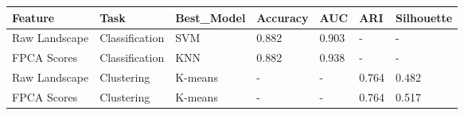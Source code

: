 
\begin{tabular}{lllllll}
\toprule
Feature & Task & Best\_Model & Accuracy & AUC & ARI & Silhouette\\
\midrule
Raw Landscape & Classification & SVM & 0.882 & 0.903 & - & -\\
FPCA Scores & Classification & KNN & 0.882 & 0.938 & - & -\\
Raw Landscape & Clustering & K-means & - & - & 0.764 & 0.482\\
FPCA Scores & Clustering & K-means & - & - & 0.764 & 0.517\\
\bottomrule
\end{tabular}
